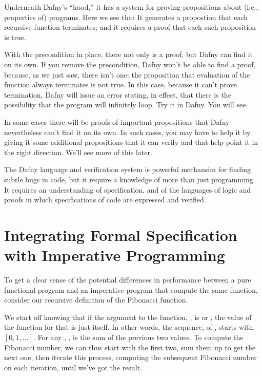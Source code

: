 \documentclass[letterpaper,10pt,english]{sphinxmanual}
\begin{document}
Underneath Dafny’s “hood,” it has a system for proving propositions
about (i.e., properties of) programs. Here we see that It generates a
propostion that each recursive function terminates; and it requires a
proof that each such proposition is true.

With the precondition in place, there not only is a proof, but Dafny
can find it on its own. If you remove the precondition, Dafny won’t be
able to find a proof, because, as we just saw, there isn’t one: the
proposition that evaluation of the function always terminates is not
true. In this case, because it can’t prove termination, Dafny will
issue an error stating, in effect, that there is the possibility that
the program will infinitely loop. Try it in Dafny.  You will see.

In some cases there will be proofs of important propositions that
Dafny nevertheless can’t find it on its own. In such cases, you may
have to help it by giving it some additional propositions that it
can verify and that help point it in the right direction. We’ll see
more of this later.

The Dafny language and verification system is powerful mechansim for
finding subtle bugs in code, but it require a knowledge of more than
just programming. It requires an understanding of specification, and
of the languages of logic and proofs in which specifications of code
are expressed and verified.


\chapter{Integrating Formal Specification with Imperative Programming}
\label{\detokenize{05-putting-it-together::doc}}\label{\detokenize{05-putting-it-together:integrating-formal-specification-with-imperative-programming}}
To get a clear sense of the potential differences in performance
between a pure functional program and an imperative program that
compute the same function, consider our recursive definition of the
Fibonacci function.

We start off knowing that if the argument to the function, , is 
or , the value of the function for that  is just  itself.  In
other words, the sequence,  of , starts with, \([0, 1, \ldots ]\).  For any , ,
is the sum of the previous two values.  To compute the 
Fibonacci number, we can thus start with the first two, sum them up to
get the next one, then iterate this process, computing the subsequent
Fibonacci number on each iteration, until we’ve got the result.
\end{document}
